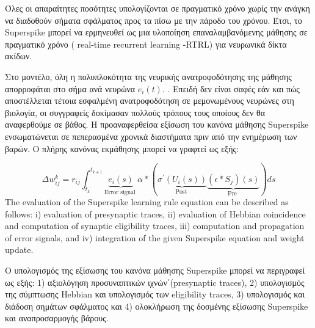 \documentclass[12pt]{report}
\begin{document}
Όλες οι απαραίτητες ποσότητες υπολογίζονται σε πραγματικό χρόνο χωρίς την ανάγκη να διαδοθούν σήματα σφάλματος προς τα πίσω με την πάροδο του χρόνου. Έτσι, το \textlatin{Superspike} μπορεί να ερμηνευθεί ως μια υλοποίηση επαναλαμβανόμενης μάθησης σε πραγματικό χρόνο (\textlatin{ real-time recurrent learning }-\textlatin{RTRL}) \cite{williams1989} για νευρωνικά δίκτα ακίδων.

Στο μοντέλο, όλη η πολυπλοκότητα της νευρικής ανατροφοδότησης της μάθησης απορροφάται στο σήμα ανά νευρώνα $e_{i}(t) .$ . Επειδή δεν είναι σαφές εάν και πώς αποστέλλεται τέτοια εσφαλμένη ανατροφοδότηση σε μεμονωμένους νευρώνες στη βιολογία, οι συγγραφείς δοκίμασαν πολλούς τρόπους τους οποίους δεν θα αναφερθούμε σε βάθος. Η προαναφερθείσα εξίσωση του κανόνα μάθησης \textlatin{Superspike} ενσωματώνεται σε πεπερασμένα χρονικά διαστήματα πριν από την ενημέρωση των βαρών. Ο πλήρης κανόνας εκμάθησης μπορεί να γραφτεί ως εξής:

\begin{equation}
\label{eqn:integratedsuperspike}
\Delta w_{i j}^{k}=r_{i j} \int_{t_{k}}^{t_{k+1}} \underbrace{e_{i}(s)}_{\text {Error signal }} \alpha *(\underbrace{\sigma^{\prime}\left(U_{i}(s)\right)}_{\text {Post }} \underbrace{\left(\epsilon * S_{j}\right)(s)}_{\text {Pre }}) d s
\end{equation}
The evaluation of the Superspike learning rule equation can be described as follows: i) evaluation of presynaptic traces, ii) evaluation of Hebbian coincidence and computation of synaptic eligibility traces, iii) computation and propagation of error signals, and iv) integration of the given Superspike equation and weight update. 

O υπολογισμός της εξίσωσης του κανόνα μάθησης \textlatin{Superspike} μπορεί να περιγραφεί ως εξής: 1) αξιολόγηση προσυναπτικών ιχνών΄(\textlatin{presynaptic traces}), 2) υπολογισμός της σύμπτωσης \textlatin{Hebbian} και υπολογισμός των \textlatin{eligibility traces}, 3) υπολογισμός και διάδοση σημάτων σφάλματος και 4) ολοκλήρωση της δοσμένης εξίσωσης \textlatin{Superspike} και αναπροσαρμογής βάρους.
\end{document}
